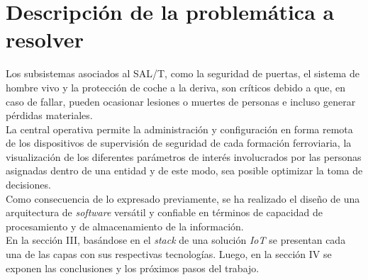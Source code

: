 
\section{Descripción de la problemática a resolver}

Los subsistemas asociados al SAL/T, como la seguridad de puertas, el sistema de hombre vivo y la protección de coche a la deriva, son críticos debido a que, en caso de fallar, pueden ocasionar lesiones o muertes de personas e incluso generar pérdidas materiales. \\ 

La central operativa permite la administración y configuración en forma remota de los dispositivos de supervisión de seguridad de cada formación ferroviaria, la visualización de los diferentes parámetros de interés involucrados por las personas asignadas dentro de una entidad y de este modo, sea posible optimizar la toma de decisiones. \\

Como consecuencia de lo expresado previamente, se ha realizado el diseño de una arquitectura de \textit{software} versátil y confiable en términos de capacidad de procesamiento y de almacenamiento de la información. \\

En la sección III, basándose en el \textit{stack} de una solución \textit{IoT} \cite{b4} se presentan cada una de las capas con sus respectivas tecnologías. Luego, en la sección IV se exponen las conclusiones y los próximos pasos del trabajo.

